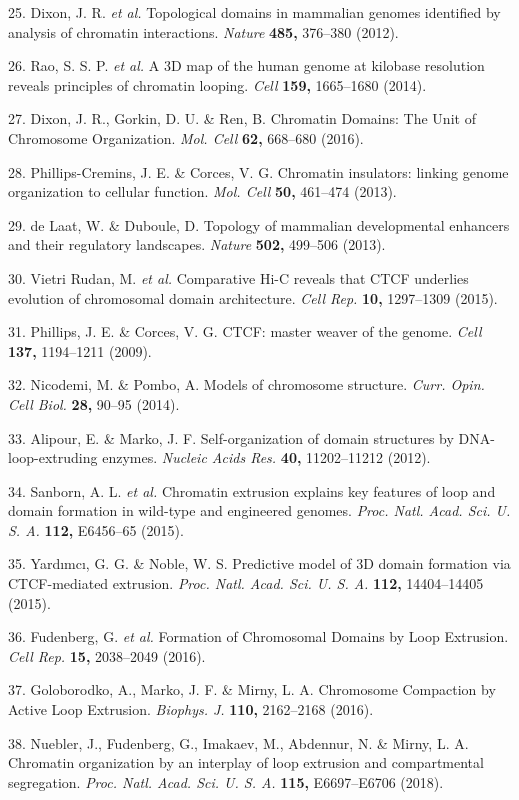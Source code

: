 \documentclass[11pt,twoside]{MPIthesis}
\theoremstyle{definition}
\theoremstyle{definition}
\theoremstyle{definition}
\theoremstyle{remark}
\begin{document}
25. Dixon, J. R. \emph{et al.} Topological domains in mammalian genomes
identified by analysis of chromatin interactions. \emph{Nature}
\textbf{485,} 376--380 (2012).

26. Rao, S. S. P. \emph{et al.} A 3D map of the human genome at kilobase
resolution reveals principles of chromatin looping. \emph{Cell}
\textbf{159,} 1665--1680 (2014).

27. Dixon, J. R., Gorkin, D. U. \& Ren, B. Chromatin Domains: The Unit
of Chromosome Organization. \emph{Mol. Cell} \textbf{62,} 668--680
(2016).

28. Phillips-Cremins, J. E. \& Corces, V. G. Chromatin insulators:
linking genome organization to cellular function. \emph{Mol. Cell}
\textbf{50,} 461--474 (2013).

29. de Laat, W. \& Duboule, D. Topology of mammalian developmental
enhancers and their regulatory landscapes. \emph{Nature} \textbf{502,}
499--506 (2013).

30. Vietri Rudan, M. \emph{et al.} Comparative Hi-C reveals that CTCF
underlies evolution of chromosomal domain architecture. \emph{Cell Rep.}
\textbf{10,} 1297--1309 (2015).

31. Phillips, J. E. \& Corces, V. G. CTCF: master weaver of the genome.
\emph{Cell} \textbf{137,} 1194--1211 (2009).

32. Nicodemi, M. \& Pombo, A. Models of chromosome structure.
\emph{Curr. Opin. Cell Biol.} \textbf{28,} 90--95 (2014).

33. Alipour, E. \& Marko, J. F. Self-organization of domain structures
by DNA-loop-extruding enzymes. \emph{Nucleic Acids Res.} \textbf{40,}
11202--11212 (2012).

34. Sanborn, A. L. \emph{et al.} Chromatin extrusion explains key
features of loop and domain formation in wild-type and engineered
genomes. \emph{Proc. Natl. Acad. Sci. U. S. A.} \textbf{112,} E6456--65
(2015).

35. Yardımcı, G. G. \& Noble, W. S. Predictive model of 3D domain
formation via CTCF-mediated extrusion. \emph{Proc. Natl. Acad. Sci. U.
S. A.} \textbf{112,} 14404--14405 (2015).

36. Fudenberg, G. \emph{et al.} Formation of Chromosomal Domains by Loop
Extrusion. \emph{Cell Rep.} \textbf{15,} 2038--2049 (2016).

37. Goloborodko, A., Marko, J. F. \& Mirny, L. A. Chromosome Compaction
by Active Loop Extrusion. \emph{Biophys. J.} \textbf{110,} 2162--2168
(2016).

38. Nuebler, J., Fudenberg, G., Imakaev, M., Abdennur, N. \& Mirny, L.
A. Chromatin organization by an interplay of loop extrusion and
compartmental segregation. \emph{Proc. Natl. Acad. Sci. U. S. A.}
\textbf{115,} E6697--E6706 (2018).
\end{document}
